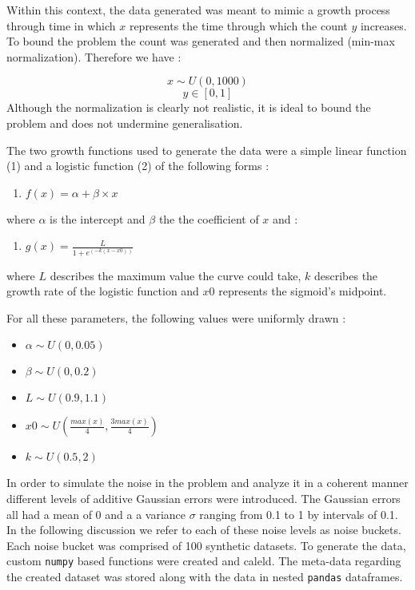\documentclass[]{article}
\providecommand{\tightlist}{%
  \setlength{\itemsep}{0pt}\setlength{\parskip}{0pt}}
\begin{document}
Within this context, the data generated was meant to mimic a growth
process through time in which \(x\) represents the time through which
the count \(y\) increases. To bound the problem the count was generated
and then normalized (min-max normalization). Therefore we have :

\[x \sim U(0, 1000)\] \[y \in[0, 1]\] Although the normalization is
clearly not realistic, it is ideal to bound the problem and does not
undermine generalisation.

The two growth functions used to generate the data were a simple linear
function (1) and a logistic function (2) of the following forms :

\begin{enumerate}
\def\labelenumi{(\arabic{enumi})}
\tightlist
\item
  \(f(x) = \alpha + \beta \times x\)
\end{enumerate}

where \(\alpha\) is the intercept and \(\beta\) the the coefficient of
\(x\) and :

\begin{enumerate}
\def\labelenumi{(\arabic{enumi})}
\setcounter{enumi}{1}
\tightlist
\item
  \(g(x) = \frac {L} {1 + e^ {(-k(x - x0))}}\)
\end{enumerate}

where \(L\) describes the maximum value the curve could take, \(k\)
describes the growth rate of the logistic function and \(x0\) represents
the sigmoid's midpoint.

For all these parameters, the following values were uniformly drawn :

\begin{itemize}
\tightlist
\item
  \(\alpha \sim U(0, 0.05)\)
\item
  \(\beta \sim U(0,0.2)\)
\item
  \(L \sim U(0.9, 1.1)\)
\item
  \(x0 \sim U(\frac{max(x)}{4} , \frac {3max(x)}{4})\)
\item
  \(k \sim U(0.5, 2)\)
\end{itemize}

In order to simulate the noise in the problem and analyze it in a
coherent manner different levels of additive Gaussian errors were
introduced. The Gaussian errors all had a mean of 0 and a a variance
\(\sigma\) ranging from 0.1 to 1 by intervals of 0.1. In the following
discussion we refer to each of these noise levels as noise buckets. Each
noise bucket was comprised of 100 synthetic datasets. To generate the
data, custom \texttt{numpy} based functions were created and caleld. The
meta-data regarding the created dataset was stored along with the data
in nested \texttt{pandas} dataframes.
\end{document}
